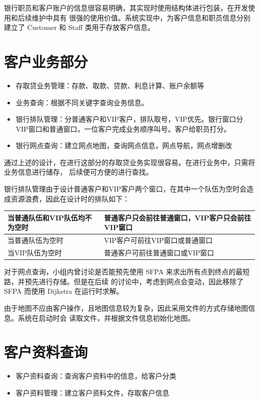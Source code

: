 \documentclass{ctexrep}
\begin{document}
银行职员和客户账户的信息很容易明确，其实现时使用结构体进行包装，在开发使用和后续维护中具有
很强的使用价值。系统实现中，为客户信息和职员信息分别建立了 Customer 和 Staff 类用于存放客户信息。

\section{客户业务部分}
\begin{itemize}
  \item 存取贷业务管理：存款、取款、贷款、利息计算、账户余额等
  \item 业务查询：根据不同关键字查询业务信息。
  \item 银行排队管理：分普通客户和VIP客户，排队取号，VIP优先。银行窗口分VIP窗口和普通窗口，一位客户完成业务顺序叫号。客户给职员打分。
  \item 银行网点查询：建立网点地图，查询网点信息，网点导航，网点增删改
\end{itemize}


通过上述的设计，在进行这部分的存取贷业务实现很容易。在进行业务中，只需将业务信息进行储存，
后续便可方便的进行查找。

银行排队管理由于设计普通客户和VIP客户两个窗口，在其中一个队伍为空时会造成资源浪费，因此在设计时的排队如下：


\begin{center}
  \begin{tabular}{|p{3.5cm} p{7.5cm}|}
    当普通队伍和VIP队伍均不为空时 & 普通客户只会前往普通窗口，VIP客户只会前往VIP窗口 \\
    \hline 当普通队伍为空时       & VIP客户可前往VIP窗口或普通窗口                   \\
    \hline 当VIP队伍为空时        & 普通客户可前往普通窗口或VIP窗口
  \end{tabular}
\end{center}

对于网点查询，小组内曾讨论是否能预先使用 SFPA 来求出所有点到终点的最短路，并预先进行存储。但是在后续
的讨论中，考虑到网点会变动，因此移除了 SFPA 而使用 Dijkstra 在运行时求解。

由于地图不应由客户操作，且地图信息较为复杂，因此采用文件的方式存储地图信息。系统在启动时会
读取文件，并根据文件信息初始化地图。

\section{客户资料查询}
\begin{itemize}
  \item 客户资料查询：查询客户资料中的信息，给客户分类
  \item 客户资料管理：建立客户资料文件，存取客户信息
\end{itemize}
\end{document}
